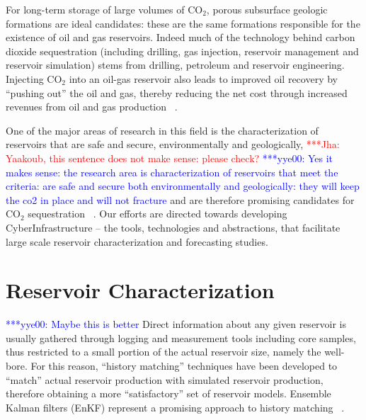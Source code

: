 \documentclass[10pt,conference,final]{IEEEtran}
\newcommand{\jhanote}[1]{ {\textcolor{red} { ***Jha: #1 }}}
\newcommand{\yyenote}[1]{ {\textcolor{blue} { ***yye00: #1 }}}
\newcommand{\jhanote}[1]{}
\newcommand{\yyenote}[1]{}
\begin{document}
For long-term storage of large volumes of CO$_2$, porous subsurface geologic formations are ideal candidates: these are the same formations responsible for the existence of oil and gas reservoirs. Indeed much of the technology behind carbon dioxide sequestration (including drilling, gas injection, reservoir management and reservoir simulation) stems from drilling, petroleum and reservoir engineering. Injecting CO$_2$ into an oil-gas reservoir also leads to improved oil recovery by ``pushing out'' the oil and gas, thereby reducing the net cost through increased revenues from oil and gas production ~\cite{EORBook}.

One of the major areas of research in this field is the characterization of reservoirs that are safe and secure, environmentally and geologically, \jhanote{Yaakoub, this sentence does not make sense: please check?} \yyenote{Yes it makes sense: the research area is characterization of reservoirs that meet the criteria: are safe and secure both environmentally and geologically: they will keep the co2 in place and will not fracture}  and are therefore promising candidates for CO$_2$ sequestration ~\cite{GeoRPT,Luigi}. Our efforts are directed towards developing CyberInfrastructure -- the tools, technologies and abstractions, that facilitate large scale reservoir characterization and forecasting studies.

\section*{Reservoir Characterization}
\yyenote{Maybe this is better} Direct information about any given reservoir is usually gathered through logging and measurement tools including core samples, thus restricted to a small portion of the actual reservoir size, namely the well-bore. For this reason, ``history matching'' techniques have been developed to ``match'' actual reservoir production with simulated reservoir production, therefore obtaining a more ``satisfactory'' set of reservoir models.  Ensemble Kalman filters (EnKF) represent a promising approach to history matching ~\cite{KalmanPaper, DO2007, LiEnKF07, DO2006}.



\end{document}

